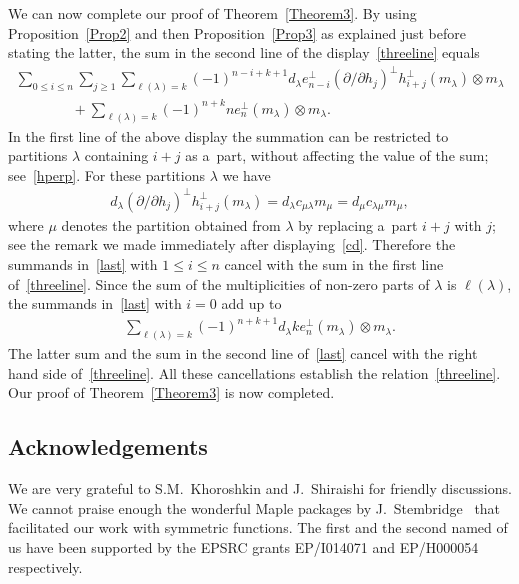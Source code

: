 \documentclass[pdftex]{sigma}
\numberwithin{equation}{section}
\renewcommand\ge{\geqslant}
\renewcommand\le{\leqslant}
\begin{document}
We can now complete our proof of Theorem~\ref{Theorem3}.
By using Proposition~\ref{Prop2} and then Proposition~\ref{Prop3}
as explained just before stating the latter, the sum in the
second line of the display~\eqref{threeline} equals
\begin{gather}
\sum_{0\le i\le n}\sum_{j\ge1}\sum_{\ell(\lambda)=k}(-1)^{n-i+k+1}
d_\lambda e_{n-i}^{\perp}(\partial /\partial h_j)^{\perp}h_{i+j}^{\perp}(m_\lambda)\otimes m_\lambda
\nonumber
\\
\qquad\qquad
{}+\sum_{\ell(\lambda)=k}(-1)^{n+k}ne_n^{\perp}(m_\lambda)\otimes m_\lambda.
\label{last}
\end{gather}
In  the f\/irst line of the above display the summation can be restricted to partitions $\lambda$ containing
$i+j$ as a~part, without af\/fecting the value of the sum; see~\eqref{hperp}.
For these partitions $\lambda$ we have
\begin{gather*}
d_\lambda(\partial /\partial h_j)^{\perp}
h_{i+j}^{\perp}(m_\lambda)=d_\lambda c_{\mu\lambda}m_\mu=d_\mu c_{\lambda\mu}m_\mu,
\end{gather*}
where $\mu$ denotes the partition obtained from $\lambda$ by replacing a~part $i+j$ with $j$; see the
remark we made immediately after displaying~\eqref{cd}.
Therefore the summands in~\eqref{last} with $1\le i\le n$ cancel with the sum in the f\/irst line
of~\eqref{threeline}.
Since the sum of the multiplicities of non-zero parts of $\lambda$ is $\ell(\lambda)$, the summands
in~\eqref{last} with $i=0$ add up to
\begin{gather*}
\sum_{\ell(\lambda)=k}(-1)^{n+k+1}d_\lambda ke_n^{\perp}(m_\lambda)\otimes m_\lambda.
\end{gather*}
The  latter sum and the sum in the second line of~\eqref{last} cancel with the right hand side
of~\eqref{threeline}.
All these cancellations establish the relation~\eqref{threeline}.
Our proof of Theorem~\ref{Theorem3} is now completed.

\subsection*{Acknowledgements}

We are very grateful to S.M.~Khoroshkin and J.~Shiraishi for friendly discussions.
We cannot praise enough the wonderful Maple packages by J.~Stembridge~\cite{St} that facilitated our work
with symmetric functions.
The f\/irst and the second named of us have been supported by the EPSRC grants
EP/I014071 and EP/H000054 respectively.
\end{document}
